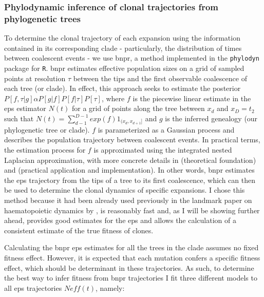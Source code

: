 \subsubsection{Phylodynamic inference of clonal trajectories from phylogenetic trees}

To determine the clonal trajectory of each expansion using the information contained in its corresponding clade - particularly, the distribution of times between coalescent events - we use \ac{bnpr}, a method implemented in the \texttt{phylodyn} \cite{Lan2015-sw,Karcher2017-kt} package for \texttt{R}. \ac{bnpr} estimates effective population sizes on a grid of sampled points at resolution $\tau$ between the tips and the first observable coalescence of each tree (or clade). In effect, this approach seeks to estimate the posterior $P[f,\tau|g]\alpha P[g|f]P[f|\tau]P[\tau]$, where $f$ is the piecewise linear estimate in the \ac{eps} estimator $N(t)$ for a grid of points along the tree between $x_d$ and $x_D=t_2$ such that $N(t) = \sum^{D-1}_{d-1}exp(f)1_{(x_d,x_{d+1}]}$ and $g$ is the inferred genealogy (our phylogenetic tree or clade). $f$ is parameterized as a Gaussian process and describes the population trajectory between coalescent events. In practical terms, the estimation process for $f$ is approximated using the integrated nested Laplacian approximation, with more concrete details in \cite{Lan2015-sw} (theoretical foundation) and \cite{Karcher2017-kt} (practical application and implementation). In other words, \ac{bnpr} estimates the \ac{eps} trajectory from the tips of a tree to its first coalescence, which can then be used to determine the clonal dynamics of specific expansions. I chose this method because it had been already used previously in the landmark paper on haematopoietic dynamics by , is reasonably fast and, as I will be showing further ahead, provides good estimates for the \ac{eps} and allows the calculation of a consistent estimate of the true fitness of clones.

Calculating the \ac{bnpr} \ac{eps} estimates for all the trees in the clade assumes no fixed fitness effect. However, it is expected that each mutation confers a specific fitness effect, which should be determinant in these trajectories. As such, to determine the best way to infer fitness from \ac{bnpr} trajectories I fit three different models to all \ac{eps} trajectories $Neff(t)$, namely:


